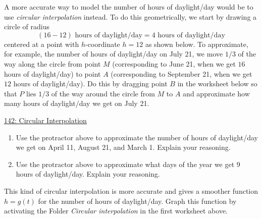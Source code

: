 \documentclass{ximera}
\begin{document}
\begin{example}
\begin{question}
A more accurate way to model the number of hours of daylight/day would be to use \emph{circular interpolation} instead. To do this geometrically, we start by drawing a circle of radius 
\[
     (16 - 12) \text{ hours of daylight/day} = 4 \text{ hours of daylight/day}
\]
centered at a point with $h$-coordinate $h=12$ as shown below. To approximate, for example, the number of hours of daylight/day on July 21, we move $1/3$ of the way along the circle from point $M$ (corresponding to June 21, when we get $16$ hours of daylight/day) to point $A$ (corresponding to September 21, when we get $12$ hours of daylight/day). Do this by dragging point $B$ in the worksheet below so that $P$ lies $1/3$ of the way around the circle from $M$ to $A$ and approximate how many hours of daylight/day we get on July 21.

 
\begin{onlineOnly}
    \begin{center}
\end{center}
\end{onlineOnly}

\href{https://www.desmos.com/calculator/dhzo6hhjw1}{142: Circular Interpolation}

\begin{enumerate}
\item Use the protractor above to approximate the number of hours of daylight/day we get on April 11, August 21, and March 1. Explain your reasoning.
\begin{freeResponse} 
\end{freeResponse}

\item Use the protractor above to approximate what days of the year we get $9$ hours of daylight/day. Explain your reasoning.
\begin{freeResponse}
\end{freeResponse}
\end{enumerate}

This kind of circular interpolation is more accurate and gives a smoother function $h=g(t)$ for the number of hours of daylight/day. Graph this function by activating the Folder \emph{Circular interpolation} in the first worksheet above.

\end{question}
\end{example}


\iffalse
\end{document}
